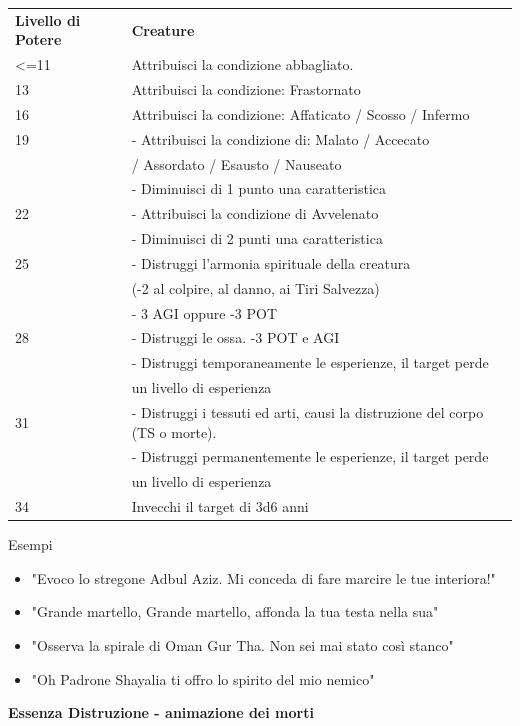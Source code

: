 \documentclass[a4paper,11pt,twoside,openany]{book}
\begin{document}
\bigskip

\begin{tabular}{L{3cm} L{13cm}}
\toprule 
\textbf{Livello di Potere} & \textbf{Creature}\tabularnewline
<=11 &Attribuisci la condizione abbagliato. \\
13 & Attribuisci la condizione: Frastornato\\
16 & Attribuisci la condizione: Affaticato / Scosso / Infermo\\
19 & - Attribuisci la condizione di: Malato / Accecato\\
& / Assordato / Esausto / Nauseato\\
& - Diminuisci di 1 punto una caratteristica\\
22 & - Attribuisci la condizione di Avvelenato\\
& - Diminuisci di 2 punti una caratteristica\\
25 & - Distruggi l’armonia spirituale della creatura \\
&(-2 al colpire, al danno, ai Tiri Salvezza)\\
& - 3 AGI oppure -3 POT\\
28 & - Distruggi le ossa. -3 POT e AGI\\
& - Distruggi temporaneamente le esperienze, il target perde\\
& un livello di esperienza\\
31& - Distruggi i tessuti ed arti, causi la distruzione del corpo (TS o morte).\\
& - Distruggi permanentemente le esperienze, il target perde\\
&un livello di esperienza\\
34 &Invecchi il target di 3d6 anni\\
\end{tabular}

\bigskip

Esempi
\begin{itemize}
\item 
"Evoco lo stregone Adbul Aziz. Mi conceda di fare marcire le tue interiora!" 
\item 
"Grande martello, Grande martello, affonda la tua testa nella sua" 
\item 
"Osserva la spirale di Oman Gur Tha. Non sei mai stato così stanco"
\item 
"Oh Padrone Shayalia ti offro lo spirito del mio nemico" 
\end{itemize}

\bigskip

\textbf{Essenza Distruzione - animazione dei morti}
\end{document}
